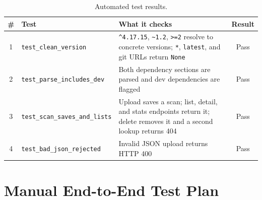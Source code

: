 \documentclass[12pt,a4paper]{report}
\begin{document}
\begin{table}[htbp]
\centering
\begin{tabularx}{\textwidth}{c >{\raggedright\arraybackslash}p{4.8cm} X c}
\toprule
\textbf{\#} & \textbf{Test} & \textbf{What it checks} & \textbf{Result} \\
\midrule
1 & \texttt{test\_clean\_version} & \verb|^4.17.15|, \verb|~1.2|, \verb|>=2| resolve to concrete versions; \texttt{*}, \texttt{latest}, and git URLs return \texttt{None} & Pass \\
2 & \texttt{test\_parse\_includes\_dev} & Both dependency sections are parsed and dev dependencies are flagged & Pass \\
3 & \texttt{test\_scan\_saves\_and\_lists} & Upload saves a scan; list, detail, and stats endpoints return it; delete removes it and a second lookup returns 404 & Pass \\
4 & \texttt{test\_bad\_json\_rejected} & Invalid JSON upload returns HTTP 400 & Pass \\
\bottomrule
\end{tabularx}
\caption{Automated test results.}
\end{table}

\section{Manual End-to-End Test Plan}
\end{document}
